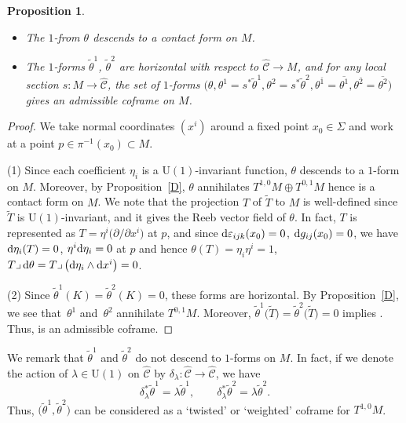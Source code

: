 \documentclass[11pt]{article}
\numberwithin{equation}{section}
\renewcommand\d{\delta}
\newcommand\e{\varepsilon}
\renewcommand\th{\theta}
\newcommand\ol{\overline}
\newcommand{\wh}{\widehat}
\numberwithin{equation}{section}
\newtheorem{Proposition}[Theorem]{Proposition}
 { \theoremstyle{definition}
\newtheorem{Definition}[Theorem]{Definition}
\newtheorem*{Notation}{Notation}
\newtheorem{Example}[Theorem]{Example}
\newtheorem{Remark}[Theorem]{Remark} }
\begin{document}
\begin{Proposition}\quad
\begin{itemize}\itemsep=0pt
\item[$(1)$] The $1$-from $\th$ descends to a contact form on $M$.
\item[$(2)$] The $1$-forms $\tilde\th^1$, $\tilde\th^2$ are horizontal with respect to $\wh{\mathcal{C}}\to M$, and for any local section ${s\colon M\to \wh{\mathcal{C}}}$, the set of $1$-forms $\bigl(\th, \th^1=s^*\tilde\th^1, \th^2=s^*\tilde\th^2, \th^{\ol1}=\ol{\th^1}, \th^{\ol2}=\ol{\th^2}\bigr)$ gives an admissible coframe on $M$.
\end{itemize}
\end{Proposition}
\begin{proof}
We take normal coordinates $(x^i)$ around a fixed point $x_0\in \Sigma$ and work at a point $p\in\pi^{-1}(x_0)\subset M$.

(1) Since each coefficient $\eta_i$ is a $\mathrm{U}(1)$-invariant function, $\th$ descends to a $1$-form on $M$. Moreover, by Proposition~\ref{D}, $\th$ annihilates $T^{1, 0}M\oplus T^{0, 1}M$ hence is a contact form on $M$. We note that the projection $T$ of $\tilde T$ to $M$ is well-defined since $\tilde T$ is $\mathrm{U}(1)$-invariant, and it gives the Reeb vector field of $\th$. In fact, $T$ is represented as $T=\eta^i\bigl(\partial/\partial x^i\bigr)$ at $p$, and since
${\rm d}\e_{ijk}(x_0)=0$, ${\rm d}g_{ij}(x_0)=0$, we have ${\rm d}\eta_i(T)=0$, $\eta^i{\rm d}\eta_i=0$ at $p$ and hence $\th(T)=\eta_i\eta^i=1$, $T\lrcorner\, {\rm d}\th=T\lrcorner\, \bigl({\rm d}\eta_i\wedge {\rm d}x^i\bigr)=0$.

(2) Since $\tilde\th^1(K)=\tilde\th^2(K)=0$, these forms are horizontal. By Proposition~\ref{D}, we see that~$\th^1$ and~$\th^2$ annihilate $T^{0, 1}M$. Moreover, $\tilde\th^1\bigl(\tilde T\bigr)=\tilde\th^2\bigl(\tilde T\bigr)=0$ implies \smash{$\th^1(T)=\th^2(T)=0$}. Thus, \smash{$\bigl(\th, \th^1, \th^2, \th^{\ol1}, \th^{\ol2}\bigr)$} is an admissible coframe.
\end{proof}

We remark that $\tilde\th^1$ and $\tilde\th^2$ do not descend to $1$-forms on $M$. In fact, if we denote the action of $\lambda\in \mathrm{U}(1)$ on $\wh{\mathcal{C}}$ by $\d_\lambda\colon \wh{\mathcal{C}}\to \wh{\mathcal{C}}$, we have
\[
\d_\lambda^* \tilde\th^1=\lambda \tilde\th^1, \qquad \d_\lambda^*\tilde\th^2=\lambda\tilde\th^2.
\]
Thus, $\bigl(\tilde\th^1, \tilde\th^2\bigr)$ can be considered as a `twisted' or `weighted' coframe for $T^{1, 0}M$.
\end{document}
